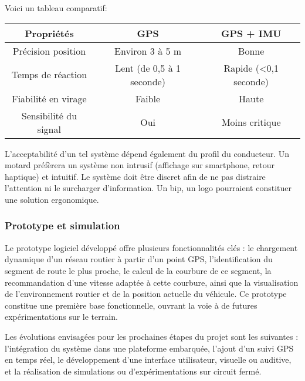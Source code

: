 \vspace{0.5cm}
Voici un tableau comparatif:\\
\begin{tabular}{|c|c|c|}
\hline
\textbf{Propriétés} & \textbf{GPS} & \textbf{GPS + IMU} \\
\hline
Précision position & Environ 3 à 5 m & Bonne \\
Temps de réaction & Lent (de 0,5 à 1 seconde) & Rapide (<0,1 seconde)\\
Fiabilité en virage & Faible & Haute \\
Sensibilité du signal & Oui & Moins critique \\
\hline
\end{tabular}

\vspace{0.5cm}
L’acceptabilité d’un tel système dépend également du profil du conducteur. Un motard préfèrera un système non intrusif (affichage sur smartphone, retour haptique) et intuitif. Le système doit être discret afin de ne pas distraire l’attention ni le surcharger d’information. Un bip, un logo pourraient constituer une solution ergonomique.



\subsubsection{Prototype et simulation}
Le prototype logiciel développé offre plusieurs fonctionnalités clés :
le chargement dynamique d’un réseau routier à partir d’un point GPS,
l’identification du segment de route le plus proche,
le calcul de la courbure de ce segment,
la recommandation d’une vitesse adaptée à cette courbure,
ainsi que la visualisation de l’environnement routier et de la position actuelle du véhicule.
Ce prototype constitue une première base fonctionnelle, ouvrant la voie à de futures expérimentations sur le terrain.

Les évolutions envisagées pour les prochaines étapes du projet sont les suivantes :
l’intégration du système dans une plateforme embarquée,
l’ajout d’un suivi GPS en temps réel,
le développement d’une interface utilisateur, visuelle ou auditive,
et la réalisation de simulations ou d’expérimentations sur circuit fermé.

